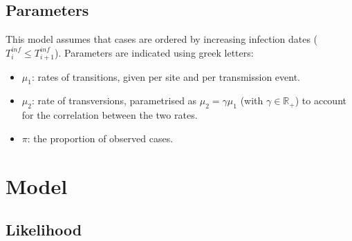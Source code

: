 \documentclass[10pt]{article}
\begin{document}
\subsection*{Parameters}
This model assumes that cases are ordered by increasing infection dates ($T_i^{inf} \leq T_{i+1}^{inf}$).
Parameters are indicated using greek letters:
\begin{itemize}
	\item $\mu_1$: rates of transitions, given per site and per transmission event.
	\item $\mu_2 $: rate of transversions, parametrised as $\mu_2 = \gamma \mu_1$ (with $\gamma \in \mathbb{R}_+$) to account for the correlation between the two rates.
	\item $\pi$: the proportion of observed cases.
\end{itemize}






\section*{Model}

\subsection*{Likelihood}
\end{document}
